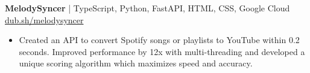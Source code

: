 \documentclass[11pt]{article}       %
\begin{document}

\textbf{MelodySyncer} | TypeScript, Python, FastAPI, HTML, CSS, Google Cloud \hfill \href{https://dub.sh/melodysyncer}{\color{blue} dub.sh/melodysyncer} \\
\vspace{-6pt}
\begin{itemize}
  \item Created an API to convert Spotify songs or playlists to YouTube within 0.2 seconds. Improved performance by 12x with multi-threading and developed a unique scoring algorithm which maximizes speed and accuracy.
\end{itemize}


\end{document}
